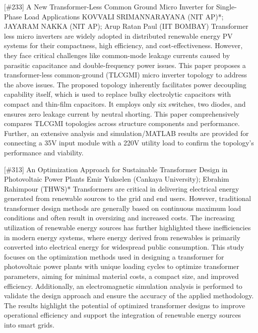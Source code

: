 {} \begin{abstract_online} {[\#233] A New Transformer-Less Common Ground Micro Inverter for Single-Phase Load Applications} {} {KOVVALI SRIMANNARAYANA (NIT AP)*; JAYARAM NAKKA (NIT AP); Arup Ratan  Paul (IIT BOMBAY)} {} Transformer less micro inverters are widely adopted in distributed renewable energy PV systems for their compactness, high efficiency, and cost-effectiveness. However, they face critical challenges like common-mode leakage currents caused by parasitic capacitance and double-frequency power issues. This paper proposes a transformer-less common-ground (TLCGMI) micro inverter topology to address the above issues. The proposed topology inherently facilitates power decoupling capability itself, which is used to replace bulky electrolytic capacitors with compact and thin-film capacitors. It employs only six switches, two diodes, and ensures zero leakage current by neutral shorting. This paper comprehensively compares TLCGMI topologies across structure components and performance. Further, an extensive analysis and simulation/MATLAB results are provided for connecting a 35V input module with a 220V utility load to confirm the topology's performance and viability. \end{abstract_online} 
{} \begin{abstract_online} {[\#313] An Optimization Approach for Sustainable Transformer Design in Photovoltaic Power Plants} {} {Emir Yukselen (Cankaya University); Ebrahim Rahimpour (THWS)*} {} Transformers are critical in delivering electrical energy generated from renewable sources to the grid and end users. However, traditional transformer design methods are generally based on continuous maximum load conditions and often result in oversizing and increased costs. The increasing utilization of renewable energy sources has further highlighted these inefficiencies in modern energy systems, where energy derived from renewables is primarily converted into electrical energy for widespread public consumption. This study focuses on the optimization methods used in designing a transformer for photovoltaic power plants with unique loading cycles to optimize transformer parameters, aiming for minimal material costs, a compact size, and improved efficiency. Additionally, an electromagnetic simulation analysis is performed to validate the design approach and ensure the accuracy of the applied methodology. The results highlight the potential of optimized transformer designs to improve operational efficiency and support the integration of renewable energy sources into smart grids. \end{abstract_online} 
